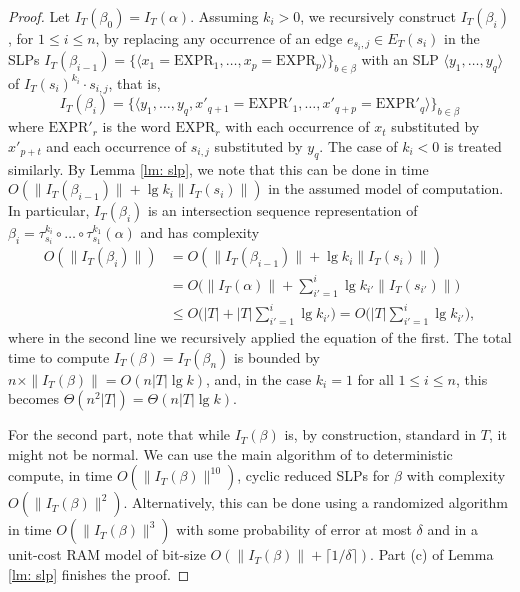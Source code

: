 \documentclass[11pt]{amsart}
\numberwithin{equation}{section}
\theoremstyle{plain}
\theoremstyle{definition}
\begin{document}
\begin{proof}
    Let $I_T(\beta_0)=I_T(\alpha)$.
    Assuming $k_i>0$, we recursively construct $I_T(\beta_i)$, for $1\leq i \leq n$, by replacing any occurrence of an edge $e_{s_i,j} \in E_T(s_i)$ in the SLPs $I_T(\beta_{i-1})=\{\langle x_1=\text{EXPR}_1,\dots, x_p=\text{EXPR}_p\rangle\}_{b\in\beta}$ with an SLP $\langle y_1,\dots,y_{q}\rangle$ of $I_T(s_i)^{k_i}\cdot s_{i,j}$, that is,
    \begin{equation*}
        I_T(\beta_i) = \{\langle  y_1,\dots,y_{q}, x'_{q+1}=\text{EXPR}'_1,\dots, x'_{q+p}=\text{EXPR}'_q \rangle\}_{b\in\beta} 
    \end{equation*}
    where $\text{EXPR}'_r$ is the word $\text{EXPR}_r$ with each occurrence of $x_t$ substituted by $x'_{p+t}$ and each occurrence of $s_{i,j}$ substituted by $y_q$. 
    The case of $k_i<0$ is treated similarly. 
    By Lemma \ref{lm: slp}, we note that this can be done in time $O(\|I_T(\beta_{i-1})\|+\lg k_i\|I_T(s_i)\|)$ in the assumed model of computation.
    In particular, $I_T(\beta_i)$ is an intersection sequence representation of $\beta_i=\tau^{k_i}_{s_i}\circ \dots \circ \tau^{k_1}_{s_1}(\alpha)$ and has complexity
    \begin{equation*}
    \begin{split}
        O(\|I_T(\beta_i)\|)&=O(\|I_T(\beta_{i-1})\|+\lg k_i\|I_T(s_i)\|)\\
        &= O\bigg(\|I_T(\alpha)\|+\sum_{i'=1}^{i}\lg k_{i'} \|I_T(s_{i'})\|\bigg)\\
        &\leq O\bigg(|T|+|T|\sum_{i'=1}^{i}\lg k_{i'} \bigg)=O\bigg(|T|\sum_{i'=1}^{i}\lg k_{i'} \bigg),
    \end{split}
    \end{equation*}
    where in the second line we recursively applied the equation of the first.
    The total time to compute $I_T(\beta)=I_T(\beta_n)$ is bounded by $n\times \|I_T(\beta)\|=O(n|T|\lg k)$, and, in the case $k_i=1$ for all $1\leq i \leq n$, this becomes $\Theta(n^2|T|)=\Theta(n|T|\lg k)$.

    For the second part, note that while $I_T(\beta)$ is, by construction, standard in $T$, it might not be normal.
    We can use the main algorithm of \cite{miyazaki1997improved} to deterministic compute, in time $O(\|I_T(\beta)\|^{10})$, cyclic reduced SLPs for $\beta$ with complexity $O(\|I_T(\beta)\|^2)$. 
    Alternatively, this can be done using a randomized algorithm in time $O(\|I_T(\beta)\|^{3})$ with some probability of error at most $\delta$ and in a unit-cost RAM model of bit-size $O(\|I_T(\beta)\|+\lceil1/\delta\rceil)$.
    Part (c) of Lemma \ref{lm: slp} finishes the proof.
\end{proof}
\end{document}
